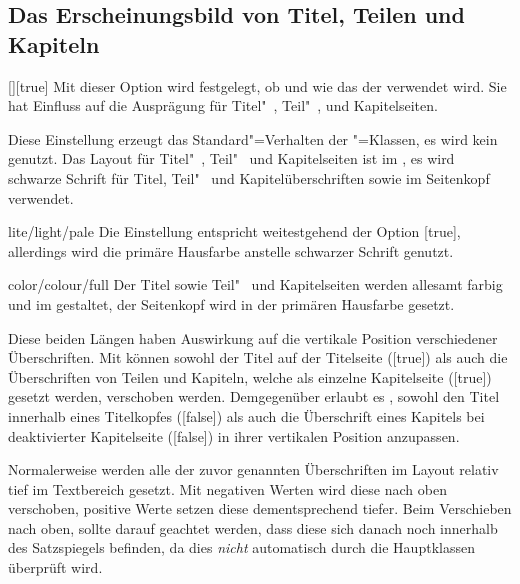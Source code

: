 \subsection{Das Erscheinungsbild von Titel, Teilen und Kapiteln}
\begin{Declaration}{[\PSet]}[true]
\printdeclarationlist%
%
%
Mit dieser Option wird festgelegt, ob und wie das \CD der \TnUD verwendet wird. 
Sie hat Einfluss auf die Ausprägung für Titel"~, Teil"~, und Kapitelseiten.
%
\begin{values}
\itemfalse
  Diese Einstellung erzeugt das Standard"=Verhalten der \KOMAScript"=Klassen, 
  es wird kein \CD genutzt.
  Das Layout für Titel"~, Teil"~ und Kapitelseiten ist im \CD, es wird 
  schwarze Schrift für Titel, Teil"~ und Kapitelüberschriften sowie im 
  Seitenkopf verwendet.
\item[lite/light/pale]
  Die Einstellung entspricht weitestgehend der Option [true], 
  allerdings wird die primäre Hausfarbe  anstelle schwarzer 
  Schrift genutzt.
\item[color/colour/full]
  Der Titel sowie Teil"~ und Kapitelseiten werden allesamt farbig und im \CD 
  gestaltet, der Seitenkopf wird in der primären Hausfarbe  
  gesetzt.
\end{values}
\end{Declaration}

\begin{Declaration}[v2.02]{}
\begin{Declaration}[v2.02]{}
\printdeclarationlist%
%
%
Diese beiden Längen haben Auswirkung auf die vertikale Position verschiedener
Überschriften. Mit  können sowohl der Titel auf der 
Titelseite ([true]) als auch die Überschriften von Teilen und 
Kapiteln, welche als einzelne Kapitelseite ([true]) gesetzt 
werden, verschoben werden. Demgegenüber erlaubt es , 
sowohl den Titel innerhalb eines Titelkopfes ([false]) als 
auch die Überschrift eines Kapitels bei deaktivierter Kapitelseite 
([false]) in ihrer vertikalen Position anzupassen.

Normalerweise werden alle der zuvor genannten Überschriften im Layout relativ 
tief im Textbereich gesetzt. Mit negativen Werten wird diese nach oben 
verschoben, positive Werte setzen diese dementsprechend tiefer. Beim 
Verschieben nach oben, sollte darauf geachtet werden, dass diese sich danach 
noch innerhalb des Satzspiegels befinden, da dies \emph{nicht} automatisch 
durch die Hauptklassen überprüft wird.
\end{Declaration}
\end{Declaration}

